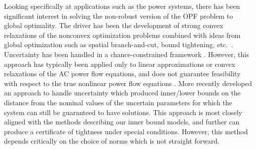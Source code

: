 Looking specifically at applications such as the power systems, there has been significant interest in solving the non-robust version of the OPF problem to global optimality.
The driver has been the development of strong convex relaxations of the nonconvex optimization problems combined with ideas from global optimization such as spatial branch-and-cut, bound tightening, etc.~\cite{BiMu2016,coffrin2015strengthening}.
Uncertainty has been handled in a chance-constrained framework \cite{BiChHa2014,zhang2011chance}.
However, this approach has typically been applied only to linear approximations or convex relaxations of the AC power flow equations, and does not guarantee feasibility with respect to the true nonlinear power flow equations \cite{BiChHa2014,kocuk2016strong,RoVrOlAn2015,TsBiTa2016}.
More recently \cite{DjTuritsyn} developed an approach to handle uncertainty which produced inner/lower bounds on the distance from the nominal values of the uncertain parameters for which the system can still be guaranteed to have solutions.
This approach is most closely aligned with the methods describing our inner bound models, and further can produce a certificate of tightness under special conditions. 
However, this method depends critically on the choice of norms which is not  straight forward.


